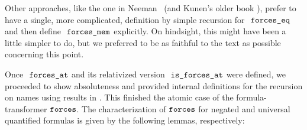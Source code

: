 Other approaches, like the one in Neeman~\cite{neeman-course} (and
Kunen's older book \cite{kunen1980}), prefer
to have a single, more complicated, definition by simple recursion for
$\forceseq$ and then define $\forcesmem$ explicitly. On hindsight,
this might have been a little simpler to do, but we preferred to be as
faithful to the text as possible concerning this point.

Once $\forcesat$ and its relativized version
$\isatt{is{\isacharunderscore}forces{\isacharunderscore}at}$ were
defined, we proceeded to show absoluteness and provided internal
definitions for the recursion on names using results in
. This finished the atomic case of the
formula-transformer $\mathop{\mathtt{forces}}$. The characterization of $\mathop{\mathtt{forces}}$
for negated and universal quantified formulas is given by the
following lemmas, respectively:
%
